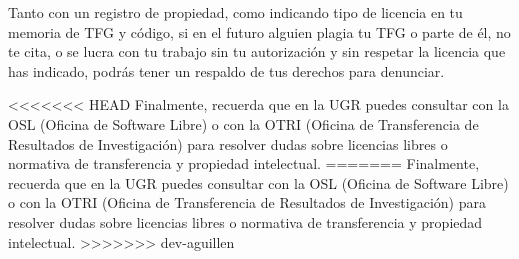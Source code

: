 Tanto con un registro de propiedad, como indicando tipo de licencia en tu memoria de TFG y código, si en el futuro alguien plagia tu TFG o parte de él, no te cita, o se lucra con tu trabajo sin tu autorización y sin respetar la licencia que has indicado, podrás tener un respaldo de tus derechos para denunciar.

<<<<<<< HEAD
Finalmente, recuerda que en la UGR puedes consultar con la OSL (Oficina de Software Libre) o con la OTRI (Oficina de Transferencia de Resultados de Investigación) para resolver dudas sobre licencias libres o normativa de transferencia y propiedad intelectual.
=======
Finalmente, recuerda que en la UGR puedes consultar con la OSL (Oficina de Software Libre) o con la OTRI (Oficina de Transferencia de Resultados de Investigación) para resolver dudas sobre licencias libres o normativa de transferencia y propiedad intelectual.
>>>>>>> dev-aguillen
